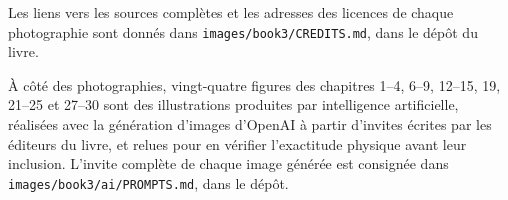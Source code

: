 Les liens vers les sources complètes et les adresses des licences de
chaque photographie sont donnés dans
\texttt{images/book3/CREDITS.md}, dans le dépôt du livre.

\bigskip
À côté des photographies, vingt-quatre figures des chapitres 1--4,
6--9, 12--15, 19, 21--25 et 27--30 sont des illustrations produites
par intelligence artificielle, réalisées avec la génération d'images
d'OpenAI à partir d'invites écrites par les éditeurs du livre, et
relues pour en vérifier l'exactitude physique avant leur inclusion.
L'invite complète de chaque image générée est consignée dans
\texttt{images/book3/ai/PROMPTS.md}, dans le dépôt.
\clearpage
